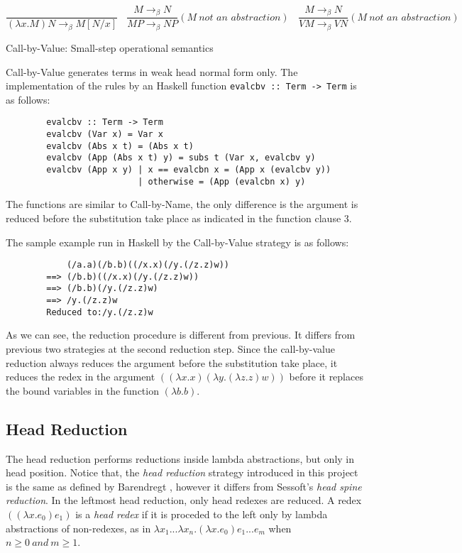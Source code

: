 \begin{equation*}
\frac{}{(\lambda x.M)N \rightarrow _\beta M[N/x]}\ \ \ \  
\frac{M \rightarrow _\beta N}{MP \rightarrow _\beta NP}(M\ \textit{not an abstraction})\ \ \ \
\frac{M \rightarrow _\beta N}{VM \rightarrow _\beta VN}(M\ \textit{not an abstraction})\ \ \ 
\end{equation*}
\begin{center}
Call-by-Value: Small-step operational semantics
\end{center}

Call-by-Value generates terms in weak head normal form only. The implementation of the rules by an Haskell function \verb|evalcbv :: Term -> Term| is as follows:

\begin{verbatim}
        evalcbv :: Term -> Term
        evalcbv (Var x) = Var x
        evalcbv (Abs x t) = (Abs x t)
        evalcbv (App (Abs x t) y) = subs t (Var x, evalcbv y)
        evalcbv (App x y) | x == evalcbn x = (App x (evalcbv y))
                          | otherwise = (App (evalcbn x) y)  
\end{verbatim}

The functions are similar to Call-by-Name, the only difference is the argument is reduced before the substitution take place as indicated in the function clause 3.

The sample example run in Haskell by the Call-by-Value strategy is as follows:

\begin{verbatim}
            (/a.a)(/b.b)((/x.x)(/y.(/z.z)w))
        ==> (/b.b)((/x.x)(/y.(/z.z)w))
        ==> (/b.b)(/y.(/z.z)w)
        ==> /y.(/z.z)w
        Reduced to:/y.(/z.z)w
\end{verbatim}

As we can see, the reduction procedure is different from previous. It differs from previous two strategies at the second reduction step. Since the call-by-value reduction always reduces the argument before the substitution take place, it reduces the redex in the argument $((\lambda x.x)(\lambda y.(\lambda z.z)w))$ before it replaces the bound variables in the function $(\lambda b.b)$.    


\subsection{Head Reduction}

The head reduction performs reductions inside lambda abstractions, but only in head position. Notice that, the \textit{head reduction} strategy introduced in this project is the same as defined by Barendregt \cite{barendregt1984lambda}, however it differs from Sessoft's \cite{sestoft2002demonstrating} \textit{head spine reduction}. In the leftmost head reduction, only head redexes are reduced. A redex $((\lambda x.e_0)e_1)$ is a \textit{head redex} if it is proceded to the left only by lambda abstractions of non-redexes, as in $\lambda x_1...\lambda x_n.(\lambda x.e_0)e_1...e_m$ when $n \geqslant 0\ and\ m \geqslant 1$.


